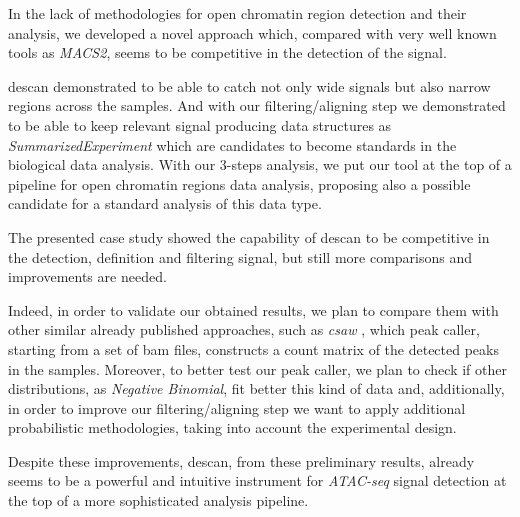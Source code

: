 In the lack of methodologies for open chromatin region detection and their analysis, we developed a novel approach which, compared with very well known tools as \textit{MACS2}, seems to be competitive in the detection of the signal.

\gls{descan} demonstrated to be able to catch not only wide signals but also narrow regions across the samples. 
And with our filtering/aligning step we demonstrated to be able to keep relevant signal producing data structures as \textit{SummarizedExperiment} which are candidates to become standards in the biological data analysis.
With our 3-steps analysis, we put our tool at the top of a pipeline for open chromatin regions data analysis, proposing also a possible candidate for a standard analysis of this data type.

The presented case study showed the capability of \gls{descan} to be competitive in the detection, definition and filtering signal, but still more comparisons and improvements are needed.

Indeed, in order to validate our obtained results, we plan to compare them with other similar already published approaches, such as \textit{csaw} \cite{Lun2015}, which peak caller, starting from a set of \gls{bam} files, constructs a count matrix of the detected peaks in the samples.
Moreover, to better test our peak caller, we plan to check if other distributions, as \textit{Negative Binomial}, fit better this kind of data and, additionally, in order to improve our filtering/aligning step we want to apply additional probabilistic methodologies, taking into account the experimental design.

Despite these improvements, \gls{descan}, from these preliminary results, already seems to be a powerful and intuitive instrument for \textit{ATAC-seq} signal detection at the top of a more sophisticated analysis pipeline.

